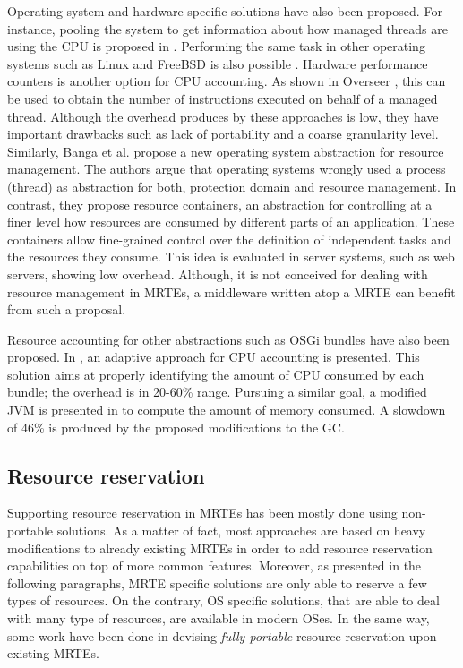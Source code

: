 Operating system and hardware specific solutions have also been proposed.
For instance, pooling the system to get information about how managed threads are using the CPU is proposed in \cite{czajkowski_jres:_1998}.
Performing the same task in other operating systems such as Linux and FreeBSD is also possible \cite{Soltesz:2007:COS:1272998.1273025, Kamp00jails:confining}.
Hardware performance counters is another option for CPU accounting.
As shown in Overseer \cite{DBLP:conf/pppj/PeternierBBP11}, this can be used to obtain the number of instructions executed on behalf of a managed thread.
Although the overhead produces by these approaches is low, they have important drawbacks such as lack of portability and a coarse granularity level.
Similarly, Banga et al. \cite{Banga:1999:RCN:296806.296810} propose a new operating system abstraction for resource management.
The authors argue that operating systems wrongly used a process (thread) as abstraction for both, protection domain and resource management.
In contrast, they propose resource containers, an abstraction for controlling at a finer level how resources are consumed by different parts of an application.
These containers allow fine-grained control over the definition of independent tasks and the resources they consume.
This idea is evaluated in server systems, such as web servers, showing low overhead.
Although, it is not conceived for dealing with resource management in MRTEs, a middleware written atop a MRTE can benefit from such a proposal.

Resource accounting for other abstractions such as OSGi bundles have also been proposed.
In \cite{Maurel:2012:AME:2304736.2304763}, an adaptive approach for CPU accounting is presented.
This solution aims at properly identifying the amount of CPU consumed by each bundle; the overhead is in 20-60\% range.
Pursuing a similar goal, a modified JVM is presented in \cite{Attouchi:2014:MMM:2602458.2602467} to compute the amount of memory consumed.
A slowdown of 46\% is produced by the proposed modifications to the GC.

\subsection{Resource reservation} \label{sec:resource-reservation-related}

Supporting resource reservation in MRTEs has been mostly done using non-portable solutions.
As a matter of fact, most approaches are based on heavy modifications to already existing MRTEs in order to add resource reservation capabilities on top of more common features.
Moreover, as presented in the following paragraphs, MRTE specific solutions are only able to reserve a few types of resources.
On the contrary, OS specific solutions, that are able to deal with many type of resources, are available in modern OSes.
In the same way, some work have been done in devising \textit{fully portable} resource reservation upon existing MRTEs.

